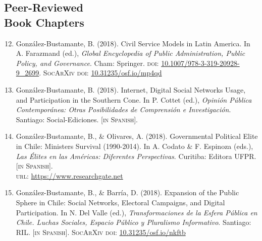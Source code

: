 \documentclass[letterpaper,margin]{res}
\newenvironment{benumerate}[1]{
    \let\oldItem\item
    \def\item{\addtocounter{enumi}{-2}\oldItem}
    \begin{enumerate}
    \setcounter{enumi}{#1}
    \addtocounter{enumi}{1}
}{
    \end{enumerate}
}
\begin{document}
\begin{resume}

\section{\footnotesize Peer-Reviewed \\ Book Chapters}

\begin{benumerate}{11}
\item{\small Gonz\'alez-Bustamante, B. (2018). Civil Service Models in Latin America. In A. Farazmand (ed.), {\itshape Global Encyclopedia of Public Administration, Public Policy, and Governance}. Cham: Springer. {\scshape doi}: \href{https://doi.org/10.1007/978-3-319-20928-9\_2699}{10.1007/978-3-319-20928-9\_2699}. {\scshape {\footnotesize SocArXiv} doi}: \href{https://doi.org/10.31235/osf.io/mp4qd}{10.31235/osf.io/mp4qd}}\vspace{1mm}

\item{\small Gonz\'alez-Bustamante, B. (2018). Internet, Digital Social Networks Usage, and Participation in the Southern Cone. In P. Cottet (ed.), {\itshape Opini\'on P\'ublica Contempor\'anea: Otras Posibilidades de Comprensi\'on e Investigaci\'on}. Santiago: Social-Ediciones. {\footnotesize \scshape [in Spanish]}.}\vspace{1mm}

\item{\small Gonz\'alez-Bustamante, B., \& Olivares, A. (2018). Governmental Political Elite in Chile: Ministers Survival (1990-2014). In A. Codato \& F. Espinoza (eds.), {\itshape Las \'Elites en las Am\'ericas: Diferentes Perspectivas}. Curitiba: Editora UFPR. {\footnotesize \scshape [in Spanish]}. \\ {\scshape url}: \href{https://www.researchgate.net/publication/325699783_Elites_en_las_Americas_diferentes_perspectivas_Elites_in_the_Americas_Different_Perspectives}{https://www.researchgate.net}}\vspace{1mm}

\item{\small Gonz\'alez-Bustamante, B., \& Barr\'ia, D. (2018). Expansion of the Public Sphere in Chile: Social Networks, Electoral Campaigns, and Digital Participation. In N. Del Valle (ed.), {\itshape Transformaciones de la Esfera P\'ublica en Chile. Luchas Sociales, Espacio P\'ublico y Pluralismo Informativo}. Santiago: RIL. {\footnotesize \scshape [in Spanish]}. {\scshape {\footnotesize SocArXiv} doi}: \href{https://doi.org/10.31235/osf.io/nkftb}{10.31235/osf.io/nkftb}}\vspace{1,1mm}


\end{benumerate}
\end{resume}
\end{document}
